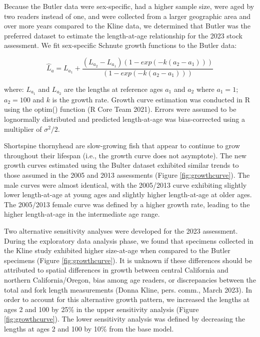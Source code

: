 \documentclass[11pt,
  english,
  letterpaper,
]{article}
\begin{document}
Because the Butler data were sex-specific, had a higher sample size, were aged by two readers instead of one, and were collected from a larger geographic area and over more years compared to the Kline data, we determined that Butler was the preferred dataset to estimate the length-at-age relationship for the 2023 stock assessment. We fit sex-specific Schnute growth functions to the Butler data:

\begin{equation} \hat{L}_{a} = L_{a_{1}}+\frac{(L_{a_{2}}-L_{a_{1}})(1-exp(-k(a_{2}-a_{1})))}{(1-exp(-k(a_{2}-a_{1})))}\end{equation}

where: \(L_{a_{1}}\) and \(L_{a_{2}}\) are the lengths at reference ages \(a_{1}\) and \(a_{2}\) where \(a_{1}=1\); \(a_{2}=100\) and \(k\) is the growth rate. Growth curve estimation was conducted in R using the optim() function (R Core Team 2021). Errors were assumed to be lognormally distributed and predicted length-at-age was bias-corrected using a multiplier of \(\sigma^2/2\).

Shortspine thornyhead are slow-growing fish that appear to continue to grow throughout their lifespan (i.e., the growth curve does not asymptote). The new growth curves estimated using the Bulter dataset exhibited similar trends to those assumed in the 2005 and 2013 assessments (Figure \ref{fig:growthcurve}). The male curves were almost identical, with the 2005/2013 curve exhibiting slightly lower length-at-age at young ages and slightly higher length-at-age at older ages. The 2005/2013 female curve was defined by a higher growth rate, leading to the higher length-at-age in the intermediate age range.

Two alternative sensitivity analyses were developed for the 2023 assessment. During the exploratory data analysis phase, we found that specimens collected in the Kline study exhibited higher size-at-age when compared to the Butler specimens (Figure \ref{fig:growthcurve}). It is unknown if these differences should be attributed to spatial differences in growth between central California and northern California/Oregon, bias among age readers, or discrepancies between the total and fork length measurements (Donna Kline, pers. comm., March 2023). In order to account for this alternative growth pattern, we increased the lengths at ages 2 and 100 by 25\% in the upper sensitivity analysis (Figure \ref{fig:growthcurve}). The lower sensitivity analysis was defined by decreasing the lengths at ages 2 and 100 by 10\% from the base model.
\end{document}

